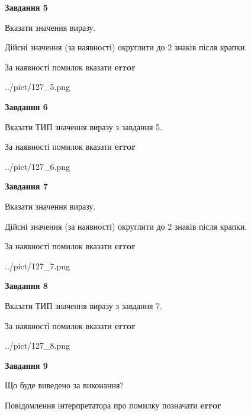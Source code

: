 \documentclass[11pt, ukrainian]{article}
\begin{document}
{\begin {large}
{\begin {center}\textbf{Завдання 5}\end {center}}\par
Вказати значення виразу. \par
Дійсні значення (за наявності) округлити до 2 знаків після крапки. \par
За наявності помилок вказати \textbf{error}

\begin{center}
	{../pict/127_5.png}
\end{center}
\newpage

{\begin {center}\textbf{Завдання 6}\end {center}}\par
Вказати ТИП значення виразу з завдання 5. \par
За наявності помилок вказати \textbf{error}

\begin{center}
	{../pict/127_6.png}
\end{center}
\newpage

{\begin {center}\textbf{Завдання 7}\end {center}}\par
Вказати значення виразу. \par
Дійсні значення (за наявності) округлити до 2 знаків після крапки. \par
За наявності помилок вказати \textbf{error}

\begin{center}
	{../pict/127_7.png}
\end{center}
\newpage

{\begin {center}\textbf{Завдання 8}\end {center}}\par
Вказати ТИП значення виразу з завдання 7. \par
За наявності помилок вказати \textbf{error}

\begin{center}
	{../pict/127_8.png}
\end{center}
\newpage

{\begin {center}\textbf{Завдання 9}\end {center}}\par
Що буде виведено за виконання? \par
Повідомлення інтерпретатора про помилку позначати \textbf{error}


\end{large}}
\end{document}
